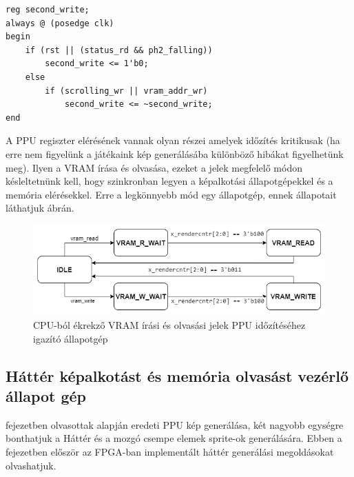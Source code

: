 \begin{lstlisting}[caption={Cím és görgetés regiszterek második írásának figyelése}, label={code:second-write}, style=prettyverilog]
reg second_write;
always @ (posedge clk) 
begin
	if (rst || (status_rd && ph2_falling))
		second_write <= 1'b0;
	else
		if (scrolling_wr || vram_addr_wr)
			second_write <= ~second_write;
end\end{lstlisting}
	
A PPU regiszter elérésének vannak olyan részei amelyek időzítés kritikusak (ha erre nem figyelünk a játékaink kép generálásába különböző hibákat figyelhetünk meg). Ilyen a VRAM írása és olvasása, ezeket a jelek megfelelő módon késleltetnünk kell, hogy szinkronban legyen a képalkotási állapotgépekkel és a memória elérésekkel. Erre a legkönnyebb mód egy állapotgép, ennek állapotait láthatjuk  ábrán.	
	
	\begin{figure}[H]
		\centering
		\includegraphics[width=120mm, keepaspectratio]{figures/VRAM-read-write-FSM}
		\caption{CPU-ból ékrekző VRAM írási és olvasási jelek PPU időzítéséhez igazító állapotgép} 
		\label{fig:VRAM-read-write-FSM}
	\end{figure} 	
	
	\subsection{Háttér képalkotást és memória olvasást vezérlő állapot gép}
	
	 fejezetben olvasottak alapján eredeti PPU kép generálása, két nagyobb egységre bonthatjuk a Háttér és a mozgó csempe elemek sprite-ok generálására. Ebben a fejezetben először az FPGA-ban implementált háttér generálási megoldásokat olvashatjuk.
	
